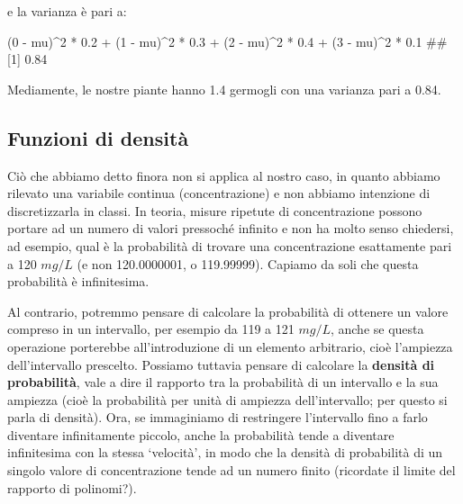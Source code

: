\documentclass[a4paper,12pt,oneside]{book}
\newenvironment{Shaded}{\begin{snugshade}}{\end{snugshade}}
\newcommand{\DecValTok}[1]{#1}
\newcommand{\FloatTok}[1]{#1}
\newcommand{\SpecialCharTok}[1]{#1}
\newcommand{\DocumentationTok}[1]{#1}
\newcommand{\NormalTok}[1]{#1}
\begin{document}
e la varianza è pari a:

\begin{Shaded}
\begin{Highlighting}[]
\NormalTok{(}\DecValTok{0} \SpecialCharTok{{-}}\NormalTok{ mu)}\SpecialCharTok{\^{}}\DecValTok{2} \SpecialCharTok{*} \FloatTok{0.2} \SpecialCharTok{+}\NormalTok{ (}\DecValTok{1} \SpecialCharTok{{-}}\NormalTok{ mu)}\SpecialCharTok{\^{}}\DecValTok{2} \SpecialCharTok{*} \FloatTok{0.3} \SpecialCharTok{+}\NormalTok{ (}\DecValTok{2} \SpecialCharTok{{-}}\NormalTok{ mu)}\SpecialCharTok{\^{}}\DecValTok{2} \SpecialCharTok{*} \FloatTok{0.4} \SpecialCharTok{+}
\NormalTok{  (}\DecValTok{3} \SpecialCharTok{{-}}\NormalTok{ mu)}\SpecialCharTok{\^{}}\DecValTok{2} \SpecialCharTok{*} \FloatTok{0.1}
\DocumentationTok{\#\# [1] 0.84}
\end{Highlighting}
\end{Shaded}

Mediamente, le nostre piante hanno 1.4 germogli con una varianza pari a 0.84.

\hypertarget{funzioni-di-densituxe0}{%
\subsection{Funzioni di densità}\label{funzioni-di-densituxe0}}

Ciò che abbiamo detto finora non si applica al nostro caso, in quanto abbiamo rilevato una variabile continua (concentrazione) e non abbiamo intenzione di discretizzarla in classi. In teoria, misure ripetute di concentrazione possono portare ad un numero di valori pressoché infinito e non ha molto senso chiedersi, ad esempio, qual è la probabilità di trovare una concentrazione esattamente pari a 120 \(mg/L\) (e non 120.0000001, o 119.99999). Capiamo da soli che questa probabilità è infinitesima.

Al contrario, potremmo pensare di calcolare la probabilità di ottenere un valore compreso in un intervallo, per esempio da 119 a 121 \(mg/L\), anche se questa operazione porterebbe all'introduzione di un elemento arbitrario, cioè l'ampiezza dell'intervallo prescelto. Possiamo tuttavia pensare di calcolare la \textbf{densità di probabilità}, vale a dire il rapporto tra la probabilità di un intervallo e la sua ampiezza (cioè la probabilità per unità di ampiezza dell'intervallo; per questo si parla di densità). Ora, se immaginiamo di restringere l'intervallo fino a farlo diventare infinitamente piccolo, anche la probabilità tende a diventare infinitesima con la stessa `velocità', in modo che la densità di probabilità di un singolo valore di concentrazione tende ad un numero finito (ricordate il limite del rapporto di polinomi?).
\end{document}
